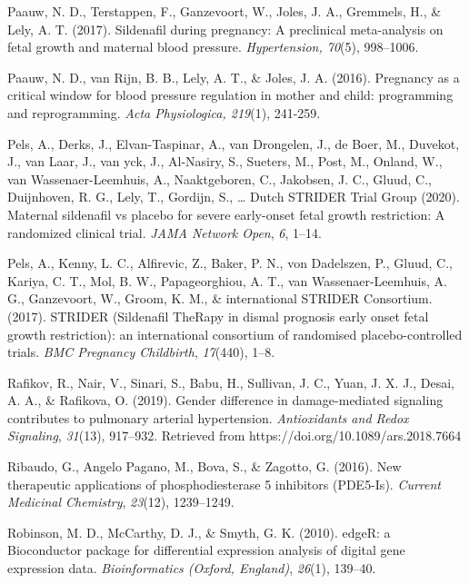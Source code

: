 \documentclass[authordate, empirical]{jote-new-article}
\begin{document}
	Paauw, N. D., Terstappen, F., Ganzevoort, W., Joles, J. A., Gremmels, H., \& Lely, A. T. (2017). Sildenafil during pregnancy: A preclinical meta-analysis on fetal growth and maternal blood pressure. \emph{Hypertension, 70}(5), 998--1006.



	Paauw, N. D., van Rijn, B. B., Lely, A. T., \& Joles, J. A. (2016). Pregnancy as a critical window for blood pressure regulation in mother and child: programming and reprogramming. \emph{Acta Physiologica, 219}(1), 241-259.



	Pels, A., Derks, J., Elvan-Taspinar, A., van Drongelen, J., de Boer, M., Duvekot, J., van Laar, J., van yck, J., Al-Nasiry, S., Sueters, M., Post, M., Onland, W., van Wassenaer-Leemhuis, A., Naaktgeboren, C., Jakobsen, J. C., Gluud, C., Duijnhoven, R. G., Lely, T., Gordijn, S., … Dutch STRIDER Trial Group (2020). Maternal sildenafil vs placebo for severe early-onset fetal growth restriction: A randomized clinical trial. \emph{JAMA Network Open}, \emph{6}, 1--14.



	Pels, A., Kenny, L. C., Alfirevic, Z., Baker, P. N., von Dadelszen, P., Gluud, C., Kariya, C. T., Mol, B. W., Papageorghiou, A. T., van Wassenaer-Leemhuis, A. G., Ganzevoort, W., Groom, K. M., \& international STRIDER Consortium. (2017). STRIDER (Sildenafil TheRapy in dismal prognosis early onset fetal growth restriction): an international consortium of randomised placebo-controlled trials. \emph{BMC Pregnancy Childbirth}, \emph{17}(440), 1--8.



	Rafikov, R., Nair, V., Sinari, S., Babu, H., Sullivan, J. C., Yuan, J. X. J., Desai, A. A., \& Rafikova, O. (2019). Gender difference in damage-mediated signaling contributes to pulmonary arterial hypertension. \emph{Antioxidants and Redox Signaling}, \emph{31}(13), 917--932. Retrieved from https://doi.org/10.1089/ars.2018.7664



	Ribaudo, G., Angelo Pagano, M., Bova, S., \& Zagotto, G. (2016). New therapeutic applications of phosphodiesterase 5 inhibitors (PDE5-Is). \emph{Current Medicinal Chemistry}, \emph{23}(12), 1239--1249.



	Robinson, M. D., McCarthy, D. J., \& Smyth, G. K. (2010). edgeR: a Bioconductor package for differential expression analysis of digital gene expression data. \emph{Bioinformatics (Oxford, England)},\emph{ 26}(1), 139--40.
\end{document}
